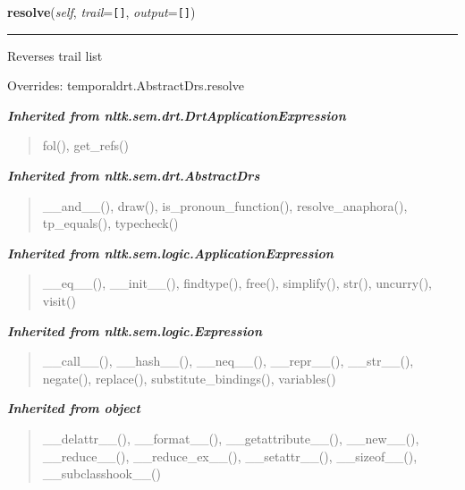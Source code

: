     \vspace{0.5ex}

\hspace{.8\funcindent}\begin{boxedminipage}{\funcwidth}

    \raggedright \textbf{resolve}(\textit{self}, \textit{trail}={\tt \texttt{[}\texttt{]}}, \textit{output}={\tt \texttt{[}\texttt{]}})

    \vspace{-1.5ex}

    \rule{\textwidth}{0.5\fboxrule}
\setlength{\parskip}{2ex}
    Reverses trail list

\setlength{\parskip}{1ex}
      Overrides: temporaldrt.AbstractDrs.resolve

    \end{boxedminipage}


\large{\textbf{\textit{Inherited from nltk.sem.drt.DrtApplicationExpression}}}

\begin{quote}
fol(), get\_refs()
\end{quote}

\large{\textbf{\textit{Inherited from nltk.sem.drt.AbstractDrs}}}

\begin{quote}
\_\_and\_\_(), draw(), is\_pronoun\_function(), resolve\_anaphora(), tp\_equals(), typecheck()
\end{quote}

\large{\textbf{\textit{Inherited from nltk.sem.logic.ApplicationExpression}}}

\begin{quote}
\_\_eq\_\_(), \_\_init\_\_(), findtype(), free(), simplify(), str(), uncurry(), visit()
\end{quote}

\large{\textbf{\textit{Inherited from nltk.sem.logic.Expression}}}

\begin{quote}
\_\_call\_\_(), \_\_hash\_\_(), \_\_neq\_\_(), \_\_repr\_\_(), \_\_str\_\_(), negate(), replace(), substitute\_bindings(), variables()
\end{quote}

\large{\textbf{\textit{Inherited from object}}}

\begin{quote}
\_\_delattr\_\_(), \_\_format\_\_(), \_\_getattribute\_\_(), \_\_new\_\_(), \_\_reduce\_\_(), \_\_reduce\_ex\_\_(), \_\_setattr\_\_(), \_\_sizeof\_\_(), \_\_subclasshook\_\_()
\end{quote}


